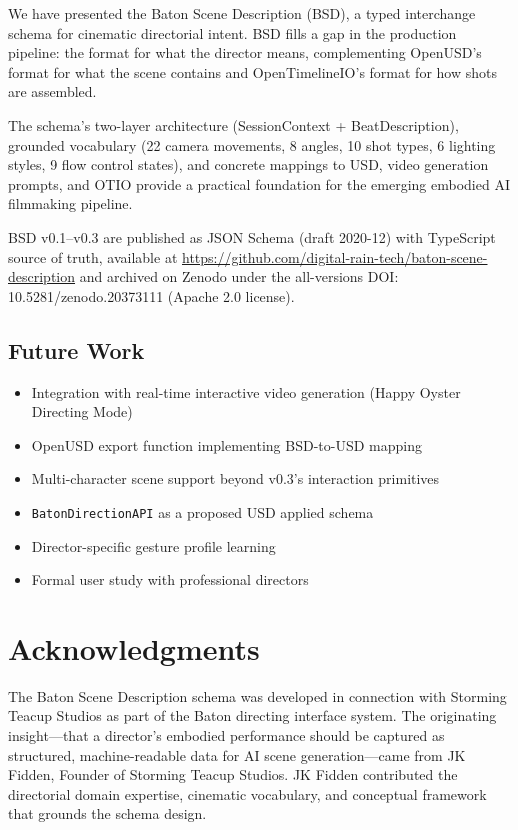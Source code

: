 \documentclass{article}
\begin{document}
We have presented the Baton Scene Description (BSD), a typed interchange schema for cinematic directorial intent. BSD fills a gap in the production pipeline: the format for what the director means, complementing OpenUSD's format for what the scene contains and OpenTimelineIO's format for how shots are assembled.

The schema's two-layer architecture (SessionContext + BeatDescription), grounded vocabulary (22 camera movements, 8 angles, 10 shot types, 6 lighting styles, 9 flow control states), and concrete mappings to USD, video generation prompts, and OTIO provide a practical foundation for the emerging embodied AI filmmaking pipeline.

BSD v0.1--v0.3 are published as JSON Schema (draft 2020-12) with TypeScript source of truth, available at \url{https://github.com/digital-rain-tech/baton-scene-description} and archived on Zenodo under the all-versions DOI: 10.5281/zenodo.20373111 (Apache 2.0 license).

\subsection{Future Work}

\begin{itemize}\tightlist
  \item Integration with real-time interactive video generation (Happy Oyster~\cite{happyoyster2026} Directing Mode)
  \item OpenUSD export function implementing BSD-to-USD mapping
  \item Multi-character scene support beyond v0.3's interaction primitives
  \item \texttt{BatonDirectionAPI} as a proposed USD applied schema
  \item Director-specific gesture profile learning
  \item Formal user study with professional directors
\end{itemize}

\section*{Acknowledgments}

The Baton Scene Description schema was developed in connection with Storming Teacup Studios as part of the Baton directing interface system. The originating insight---that a director's embodied performance should be captured as structured, machine-readable data for AI scene generation---came from JK Fidden, Founder of Storming Teacup Studios. JK Fidden contributed the directorial domain expertise, cinematic vocabulary, and conceptual framework that grounds the schema design.



\end{document}
